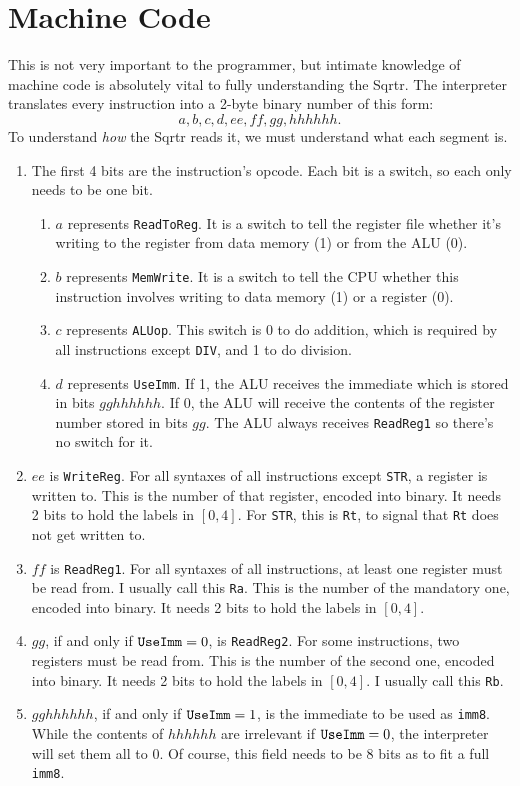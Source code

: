\documentclass[12pt, oneside]{memoir}
\newcommand{\R}[1]{{\color{register}\texttt{R#1}}}
\newcommand{\imm}{{\color{imm}\texttt{imm8}}}
\newcommand{\instruction}[1]{{\color{instruction}\texttt{#1}}}
\begin{document}
\chapter{Machine Code}
This is not very important to the programmer, but intimate knowledge of machine code is absolutely vital to fully understanding the Sqrtr. The interpreter translates every instruction into a 2-byte binary number of this form:
\begin{equation*}
    a,b,c,d,ee,ff,gg,hhhhhh.
\end{equation*}
To understand \textit{how} the Sqrtr reads it, we must understand what each segment is.
\begin{enumerate}
    \item The first 4 bits are the instruction's opcode. Each bit is a switch, so each only needs to be one bit.
    \begin{enumerate}
        \item$a$ represents \texttt{ReadToReg}. It is a switch to tell the register file whether it's writing to the register from data memory (1) or from the ALU (0).
        \item $b$ represents \texttt{MemWrite}. It is a switch to tell the CPU whether this instruction involves writing to data memory (1) or a register (0).
        \item $c$ represents \texttt{ALUop}. This switch is 0 to do addition, which is required by all instructions except \instruction{DIV}, and 1 to do division.
        \item $d$ represents \texttt{UseImm}. If 1, the ALU receives the immediate which is stored in bits $gghhhhhh$. If 0, the ALU will receive the contents of the register number stored in bits $gg$. The ALU always receives \texttt{ReadReg1} so there's no switch for it.
    \end{enumerate}
    \item $ee$ is \texttt{WriteReg}. For all syntaxes of all instructions except \instruction{STR}, a register is written to. This is the number of that register, encoded into binary. It needs 2 bits to hold the labels in $[0,4]$. For \instruction{STR}, this is \R{t}, to signal that \R{t} does not get written to.
    \item $ff$ is \texttt{ReadReg1}. For all syntaxes of all instructions, at least one register must be read from. I usually call this \R{a}. This is the number of the mandatory one, encoded into binary. It needs 2 bits to hold the labels in $[0,4]$.
    \item $gg$, if and only if $\text{\texttt{UseImm}} = 0$, is \texttt{ReadReg2}. For some instructions, two registers must be read from. This is the number of the second one, encoded into binary. It needs 2 bits to hold the labels in $[0,4]$. I usually call this \R{b}.
    \item $gghhhhhh$, if and only if $\text{\texttt{UseImm}} = 1$, is the immediate to be used as \imm. While the contents of $hhhhhh$ are irrelevant if $\text{\texttt{UseImm}} = 0$, the interpreter will set them all to 0. Of course, this field needs to be 8 bits as to fit a full \imm.
\end{enumerate}
\end{document}
